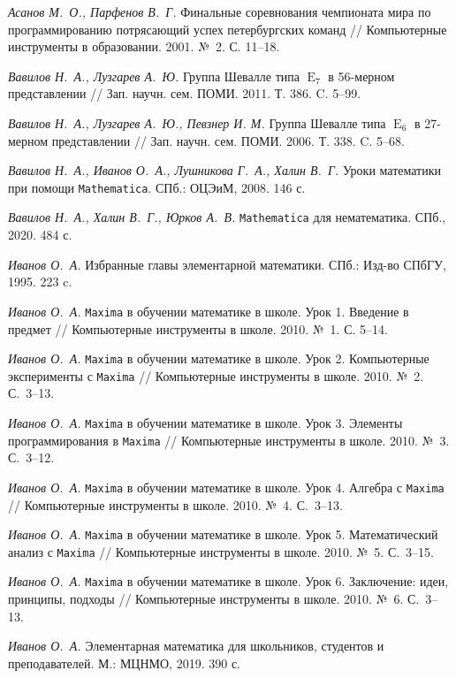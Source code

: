 \documentclass[intlimits,twoside,a4paper,11pt]{article}
\def\E{\operatorname{E}}
\begin{document}
\begin{thebibliography}{99}
{\footnotesize 	
	 {\it Асанов М.~О., Парфенов В.~Г.} Финальные соревнования чемпионата 
	мира по программированию потрясающий успех петербургских команд // Компьютерные
инструменты в образовании. 2001. №~2. С. 11--18.
	
	 {\it  Вавилов Н.~А., Лузгарев А.~Ю.} Группа Шевалле типа 
	$\E_7$ в 56-мерном представлении // Зап. научн. сем. ПОМИ. 2011. Т. 386. C. 5--99.
	
	
	 {\it  Вавилов Н.~А., Лузгарев А.~Ю., Певзнер И. М.}
	Группа Шевалле типа $\E_6$ в 27-мерном представлении // Зап. научн. сем. ПОМИ. 2006.
	Т. 338. C. 5--68. 
	
	 {\it Вавилов Н.~А., Иванов О.~А., Лушникова Г.~А., Халин В.~Г.}
	Уроки математики при помощи {\tt Mathematica}. СПб.: ОЦЭиМ,  2008. 146 с.
	
	 {\it Вавилов Н.~А., Халин В.~Г., Юрков А.~В.}
	{\tt Mathematica} для нематематика. СПб., 2020. 484 с.
	
	 {\it Иванов О.~А.\/} Избранные главы элементарной математики. СПб.: Изд-во
	СПбГУ, 1995. 223 c.
	
	 {\it Иванов О.~А.\/} {\tt Maxima} в обучении математике в школе.
	Урок 1. Введение в предмет //
	Компьютерные инструменты в школе. 2010. №~1. С. 5--14.
	
	 {\it Иванов О.~А.\/} {\tt Maxima} в обучении математике в школе.
	Урок 2. Компьютерные эксперименты с {\tt Maxima} //
	Компьютерные инструменты в школе. 2010. №~2. С.~3--13.
	
	 {\it Иванов О.~А.\/} {\tt Maxima} в обучении математике в школе.
	Урок 3. Элементы программирования в {\tt Maxima} //
	Компьютерные инструменты в школе. 2010. №~3. С.~3--12.
	
	 {\it Иванов О.~А.\/} {\tt Maxima} в обучении математике в школе.
	Урок 4. Алгебра с {\tt Maxima} //
	Компьютерные инструменты в школе. 2010. №~4. С.~3--13.
	
	 {\it Иванов О.~А.\/} {\tt Maxima} в обучении математике в школе.
	Урок 5. Математический анализ с {\tt Maxima} //
	Компьютерные инструменты в школе. 2010. №~5. С.~3--15.
	
	 {\it Иванов О.~А.\/} {\tt Maxima} в обучении математике в школе.
	Урок 6. Заключение: идеи, принципы, подходы // 
	Компьютерные инструменты в школе. 2010. №~6. С.~3--13.
	
	 {\it Иванов О.~А.\/}
	Элементарная математика для школьников, студентов и преподавателей.
	М.: МЦНМО,   2019. 390 с.
	
}
\end{thebibliography}
\end{document}
